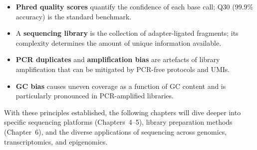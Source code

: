 \begin{itemize}[itemsep=2pt]
  \item \textbf{Phred quality scores} quantify the confidence of each base call; Q30 (99.9\% accuracy) is the standard benchmark.
  \item A \textbf{sequencing library} is the collection of adapter-ligated fragments; its complexity determines the amount of unique information available.
  \item \textbf{PCR duplicates} and \textbf{amplification bias} are artefacts of library amplification that can be mitigated by PCR-free protocols and UMIs.
  \item \textbf{GC bias} causes uneven coverage as a function of GC content and is particularly pronounced in PCR-amplified libraries.
\end{itemize}

With these principles established, the following chapters will dive deeper into specific sequencing platforms (Chapters~4--5), library preparation methods (Chapter~6), and the diverse applications of sequencing across genomics, transcriptomics, and epigenomics.
